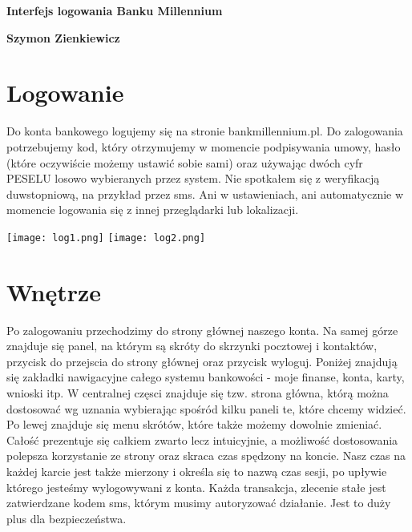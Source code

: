 \documentclass[12pt]{article}
\begin{document}
 \begin{titlepage}
 \begin{center}
        \vspace*{1cm}
 
        \Huge
        \textbf{Interfejs logowania Banku Millennium}
 
        \vspace{0.5cm}
        \LARGE
       
 
        \vspace{1.5cm}
 
        \textbf{Szymon Zienkiewicz}
 
        \vfill
    \end{center}
 \end{titlepage}
 \section{Logowanie}
 Do konta bankowego logujemy się na stronie bankmillennium.pl. Do zalogowania potrzebujemy kod, który otrzymujemy w momencie podpisywania umowy, hasło (które oczywiście możemy ustawić sobie sami) oraz używając dwóch cyfr PESELU losowo wybieranych przez system. Nie spotkałem się z weryfikacją duwstopniową, na przykład przez sms. Ani w ustawieniach, ani automatycznie w momencie logowania się z innej przeglądarki lub lokalizacji.
 \newline
 \begin{center}
 \texttt{[image: log1.png]} 
 \texttt{[image: log2.png]}
 \end{center}
 \section{Wnętrze}
 Po zalogowaniu przechodzimy do strony głównej naszego konta. Na samej górze znajduje się panel, na którym są skróty do skrzynki pocztowej i kontaktów, przycisk do przejscia do strony głównej oraz przycisk wyloguj. Poniżej znajdują się zakładki nawigacyjne całego systemu bankowości - moje finanse, konta, karty, wnioski itp. W centralnej częsci znajduje się tzw. strona główna, którą można dostosować wg uznania wybierając spośród kilku paneli te, które chcemy widzieć. Po lewej znajduje się menu skrótów, które także możemy dowolnie zmieniać. Całość prezentuje się całkiem zwarto lecz intuicyjnie, a możliwość dostosowania polepsza korzystanie ze strony oraz skraca czas spędzony na koncie. Nasz czas na każdej karcie jest także mierzony i określa się to nazwą czas sesji, po upływie którego jesteśmy wylogowywani z konta. Każda transakcja, zlecenie stałe jest zatwierdzane kodem sms, którym musimy autoryzować działanie. Jest to duży plus dla bezpieczeństwa.
\end{document}
